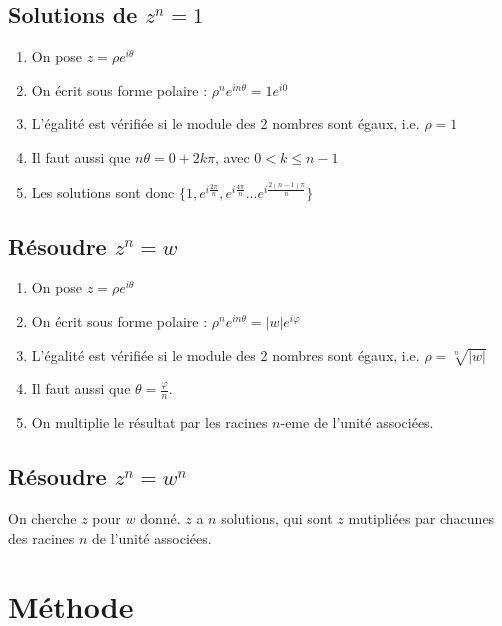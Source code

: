 \documentclass[french]{yLectureNote}
\begin{document}
\subsection{Solutions de $z^n=1$}
\begin{enumerate}
 \item On pose $z=\rho e^{i\theta}$
 \item On écrit sous forme polaire : $\rho^ne^{in\theta} = 1e^{i0}$
 \item L'égalité est vérifiée si le module des 2 nombres sont égaux, i.e. $\rho = 1$
 \item Il faut aussi que $n\theta = 0+2k\pi$, avec $0<k\leq n-1$
 \item Les solutions sont donc $\{1, e^{i\frac{2\pi}{n}}, e^{i\frac{4\pi}{n}}\dots e^{i\frac{2(n-1)\pi}{n}}\}$
\end{enumerate}
\subsection{Résoudre $z^n = w$}
\begin{enumerate}
 \item On pose $z=\rho e^{i\theta}$
 \item On écrit sous forme polaire : $\rho^ne^{in\theta} = |w|e^{i\varphi}$
 \item L'égalité est vérifiée si le module des 2 nombres sont égaux, i.e. $\rho = \sqrt[n]{|w|}$
 \item Il faut aussi que $\theta = \frac{\varphi}{n}$.
 \item On multiplie le résultat par les racines $n$-eme de l'unité associées.
\end{enumerate}
\subsection{Résoudre $z^n = w^n$}
On cherche $z$ pour $w$ donné. $z$ a $n$ solutions, qui sont $z$ mutipliées par chacunes des racines $n$ de l'unité associées.
\section{Méthode}
\end{document}
